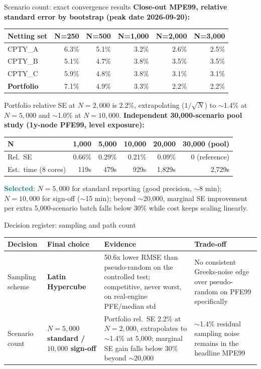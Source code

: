 \documentclass[8pt,aspectratio=169]{beamer}
\newcommand{\good}{\textcolor{teal}{\textbf{Selected}}}
\begin{document}
\begin{frame}{Scenario count: exact convergence results}
  \small
  \textbf{Close-out MPE99, relative standard error by bootstrap (peak date 2026-09-20):}
  \begin{tabular}{lrrrrr}
    \toprule
    \textbf{Netting set} & \textbf{N=250} & \textbf{N=500} & \textbf{N=1,000} & \textbf{N=2,000} & \textbf{N=3,000} \\
    \midrule
    CPTY\_A & 6.3\% & 5.1\% & 3.2\% & 2.6\% & 2.5\% \\
    CPTY\_B & 5.1\% & 4.7\% & 3.8\% & 3.5\% & 3.5\% \\
    CPTY\_C & 5.9\% & 4.8\% & 3.8\% & 3.1\% & 3.1\% \\
    \textbf{Portfolio} & 7.1\% & 4.9\% & 3.3\% & 2.2\% & 2.2\% \\
    \bottomrule
  \end{tabular}
  \vspace{4pt}

  Portfolio relative SE at $N{=}2{,}000$ is 2.2\%, extrapolating ($1/\sqrt{N}$) to $\sim$1.4\% at $N{=}5{,}000$ and $\sim$1.0\% at $N{=}10{,}000$.
  \vspace{8pt}
  \textbf{Independent 30,000-scenario pool study (1y-node PFE99, level exposure):}
  \begin{tabular}{lrrrrr}
    \toprule
    \textbf{N} & 1,000 & 5,000 & 10,000 & 20,000 & 30,000 (pool) \\
    \midrule
    Rel.\ SE & 0.66\% & 0.29\% & 0.21\% & 0.09\% & 0 (reference) \\
    Est.\ time (8 cores) & 119s & 479s & 929s & 1,829s & 2,729s \\
    \bottomrule
  \end{tabular}
  \vspace{4pt}

  \good: $N{=}5{,}000$ for standard reporting (good precision, $\sim$8 min); $N{=}10{,}000$ for sign-off ($\sim$15 min); beyond $\sim$20,000, marginal SE improvement per extra 5,000-scenario batch falls below 30\% while cost keeps scaling linearly.
\end{frame}

\begin{frame}{Decision register: sampling and path count}
  \small
  \begin{tabular}{p{}p{}p{}p{}}
    \toprule
    \textbf{Decision} & \textbf{Final choice} & \textbf{Evidence} & \textbf{Trade-off} \\
    \midrule
    Sampling scheme & \textbf{Latin Hypercube} & 50.6x lower RMSE than pseudo-random on the controlled test; competitive, never worst, on real-engine PFE/median std & No consistent Greeks-noise edge over pseudo-random on PFE99 specifically \\
    Scenario count & \textbf{$N{=}5{,}000$ standard / $10{,}000$ sign-off} & Portfolio rel.\ SE 2.2\% at $N{=}2{,}000$, extrapolates to $\sim$1.4\% at 5,000; marginal SE gain falls below 30\% beyond $\sim$20,000 & $\sim$1.4\% residual sampling noise remains in the headline MPE99 \\
    \bottomrule
  \end{tabular}
\end{frame}
\end{document}
